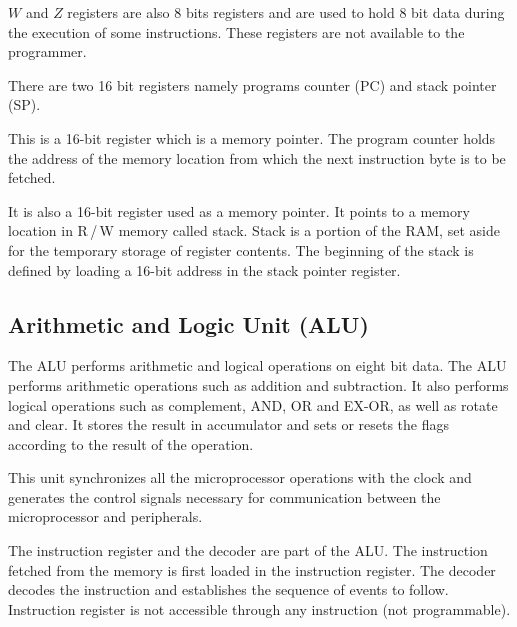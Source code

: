 $W$ and $Z$ registers are also 8 bits registers and are used to hold 8 bit data during the execution of some instructions. These registers are not available to the programmer.

\medskip
{}

There are two 16 bit registers namely programs counter (PC) and stack pointer (SP).

\medskip
{}

This is a 16-bit register which is a memory pointer. 
The program counter holds the address of the memory location from which the next instruction byte is to be fetched.

\medskip
{}

It is also a 16-bit register used as a memory pointer. It points to a memory location in R\,/\,W memory called stack. Stack is a portion of the RAM, set aside for the temporary storage of register contents. The beginning of the stack is defined by loading a 16-bit address in the stack pointer register.

\subsection*{Arithmetic and Logic Unit (ALU)}

The ALU performs arithmetic and logical operations on eight bit data. The ALU performs arithmetic operations such as addition and subtraction. It also performs logical operations such as complement, AND, OR and EX-OR, as well as rotate and clear. It stores the result in accumulator and sets or resets the flags according to the result of the operation.

\medskip
{}

This unit synchronizes all the microprocessor operations with the clock and generates the control signals necessary for communication between the microprocessor and peripherals.

\medskip
{}

The instruction register and the decoder are part of the ALU. The instruction fetched from the memory is first loaded in the instruction register. The decoder decodes the instruction and establishes the sequence of events to follow. Instruction register is not accessible through any instruction (not programmable).

